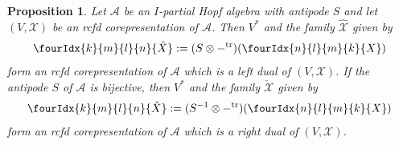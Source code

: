 \documentclass[10pt]{article}
\DeclareMathOperator{\tr}{\mathrm{tr}}
\newcommand{\dual}[1]{#1^{*}}
\newcommand{\dualop}[1]{#1^{\tr}}
\newcommand{\dualco}[1]{\hat{#1}}
\newcommand{\dualcor}[1]{\check{#1}}
\newcommand{\Gr}[5]{\fourIdx{#2}{#4}{#3}{#5}{#1}}%
\newtheorem{Prop}[Theorem]{Proposition}
\theoremstyle{definition}
\numberwithin{equation}{section}
\begin{document}
\begin{Prop}
  Let $\mathscr{A}$ be an $I$-partial Hopf algebra with antipode $S$
  and  let $(V,\mathscr{X})$ be an rcfd
  corepresentation of $\mathscr{A}$. Then $\dual{V}$ and the family
  $\dualco{\mathscr{X}}$ given by
   \begin{align} \label{eq:rep-left-dual}
\Gr{\dualco{X}}{k}{l}{m}{n}   :=  (S \otimes \dualop{-})(\Gr{X}{n}{m}{l}{k}) 
   \end{align} 
   form an rcfd corepresentation of $\mathscr{A}$  which is a left dual of $(V,\mathscr{X})$. If the antipode
   $S$ of $\mathscr{A}$ is bijective, then $\dual{V}$ and the family
   $\dualcor{\mathscr{X}}$ given by 
   \begin{align} \label{eq:rep-right-dual}
 \Gr{\dualcor{X}}{k}{l}{m}{n} :=(S^{-1}
   \otimes \dualop{-})(\Gr{X}{n}{m}{l}{k})    
   \end{align}
 form an rcfd corepresentation
 of $\mathscr{A}$ which is a
   right dual of $(V,\mathscr{X})$.
  \end{Prop}
\end{document}
